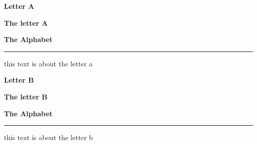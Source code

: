 \documentclass[
  10pt,
  a5paper,
  onecolumn,
  twoside]{article}
\begin{document}
\newpage

  \thispagestyle{firstpage}  
    \begin{center}
      \Huge
      \textbf{Letter A}
      \par
      \vspace{0.50cm}
      \large
      \textbf{The letter A}
      \par
      \vspace{0.20cm}
      \small
      \textbf{The Alphabet}
      \par
      \vspace{0cm}
      \rule{0.4\textwidth}{0.5pt}
    \end{center}

\chead[]{}
\lfoot[\thepage]{}
\cfoot[]{}
\rfoot[]{\thepage}

this text is about the letter a

\lipsum[1-5]

\renewcommand{\maketitle}{
  \thispagestyle{firstpage}  
    \begin{center}
      \Huge
      \textbf{Letter B}
      \par
      \vspace{0.50cm}
      \large
      \textbf{The letter B}
      \par
      \vspace{0.20cm}
      \small
      \textbf{The Alphabet}
      \par
      \vspace{0cm}
      \rule{0.4\textwidth}{0.5pt}
    \end{center}
}

\newpage

  \thispagestyle{firstpage}  
    \begin{center}
      \Huge
      \textbf{Letter B}
      \par
      \vspace{0.50cm}
      \large
      \textbf{The letter B}
      \par
      \vspace{0.20cm}
      \small
      \textbf{The Alphabet}
      \par
      \vspace{0cm}
      \rule{0.4\textwidth}{0.5pt}
    \end{center}

\chead[]{}
\lfoot[\thepage]{}
\cfoot[]{}
\rfoot[]{\thepage}

this text is about the letter b

\lipsum[6-10]
\end{document}
